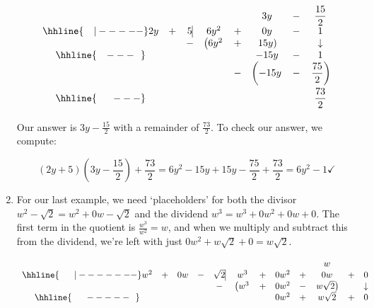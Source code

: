 \documentclass{ximera}
\begin{document}
\begin{exampleSol}
\begin{enumerate}
            \setlength\arraycolsep{0.1pt}\setlength\extrarowheight{5pt}
            \[ 
            \begin{array}{cccccccc}
                & & & & & 3y & - & \dfrac{15}{2}  \\ \hhline{~~~|-----}
                2y& + & 5  \vline& 6y^2 & + & 0y & - & 1  \\
                &  &  -& \left(6y^2 \right. & + & \left.  15y\right) &  & \downarrow  \\ \hhline{~~~---~~} 
                &  &  &   &  & -15y & - & 1  \\ 
                &  &  &   & - & \left(-15y\vphantom{\dfrac{75}{2}} \right. & - & \left. \dfrac{75}{2} \right) \\ \hhline{~~~~~---} 
                &  &  &   &   &  & & \dfrac{73}{2} \vphantom{\sqrt{\dfrac{73}{2}}}\\
            \end{array}
            \]
            \setlength\arraycolsep{5pt}
            \setlength\extrarowheight{0pt}
             
            Our answer is $3y - \frac{15}{2}$ with a remainder of $\frac{73}{2}$.  To check our answer, we compute:
            
            \[ 
                (2y + 5)\left(3y - \dfrac{15}{2}\right) + \dfrac{73}{2} = 6y^2 - 15y + 15y - \dfrac{75}{2} + \dfrac{73}{2} = 6y^2 - 1  \checkmark
            \]
            
        \item For our last example, we need `placeholders' for both the divisor  $w^2 - \sqrt{2} = w^2 + 0w -\sqrt{2}$ and the dividend $w^3 = w^3 + 0w^2 + 0w + 0$.  The first term in the quotient is $\frac{w^3}{w^2} = w$, and when we multiply and subtract this from the dividend, we're left with just $0w^2 + w\sqrt{2} + 0 = w\sqrt{2}$.
            
            \setlength\arraycolsep{0.1pt}
            \setlength\extrarowheight{2pt}
            
            \[ 
            \begin{array}{cccccccccccc}
                &   &    &   &                    &     &   &      &   &  w &   & \\ \hhline{~~~~~|-------}
                w^2 & + & 0w & - & \sqrt{2}  \vline & w^3 & + & 0w^2 & + & 0w & + & 0  \\
                &   &    &    &                  -&\left(w^3\vphantom{w\sqrt{2}} \right. & + & 0w^2 & - & \left.  w\sqrt{2} \right) & & \downarrow \\ \hhline{~~~~~-----~~}
                &   &    &    &                   &                                       &  &  0w^2     &  + &   w\sqrt{2}  & + & 0\\ 
            \end{array}
            \]
            \setlength\arraycolsep{5pt}
            \setlength\extrarowheight{0pt}
            

\end{enumerate}
\end{exampleSol}
\end{document}
